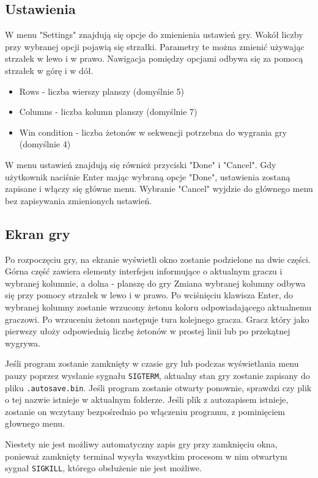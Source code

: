 \documentclass{article}
\begin{document}
\subsection*{Ustawienia}
W menu "Settings" znajdują się opcje do zmienienia ustawień gry. Wokół liczby przy wybranej opcji pojawią się strzałki. 
Parametry te można zmienić używając strzałek w lewo i w prawo. Nawigacja pomiędzy opcjami odbywa się za pomocą strzałek
w górę i w dół.
\begin{itemize}
    \item Rows - liczba wierszy planszy (domyślnie 5)
    \item Columns - liczba kolumn planszy (domyślnie 7)
    \item Win condition - liczba żetonów w sekwencji potrzebna do wygrania gry (domyślnie 4)
\end{itemize}
W menu ustawień znajdują się również przyciski "Done" i "Cancel". Gdy użytkownik naciśnie Enter mając
wybraną opcje "Done", ustawienia zostaną zapisane i włączy się główne menu. Wybranie "Cancel" wyjdzie do głównego menu
bez zapisywania zmienionych ustawień.

\subsection*{Ekran gry}

Po rozpoczęciu gry, na ekranie wyświetli okno zostanie podzielone na dwie części. Górna część zawiera elementy
interfejsu informujące o aktualnym graczu i wybranej kolumnie, a dolna - planszę do gry
Zmiana wybranej kolumny odbywa się przy pomocy strzałek w lewo i w prawo. Po wciśnięciu klawisza Enter, do wybranej
kolumny zostanie wrzucony żetonu koloru odpowiadającego aktualnemu graczowi. Po wrzuceniu żetonu następuje tura
kolejnego gracza. Gracz który jako pierwszy ułoży odpowiednią liczbę żetonów w prostej linii lub po przekątnej wygrywa.

Jeśli program zostanie zamknięty w czasie gry lub podczas wyświetlania menu pauzy poprzez wysłanie sygnału 
\texttt{SIGTERM}, aktualny stan gry zostanie zapisany do pliku \texttt{.autosave.bin}. 
Jeśli program zostanie otwarty ponownie, sprawdzi czy plik o tej nazwie istnieje
w aktualnym folderze. Jeśli plik z autozapisem istnieje, zostanie on wczytany bezpośrednio po włączeniu programu,
z pominięciem głownego menu.

Niestety nie jest możliwy automatyczny zapis gry przy zamknięciu okna, ponieważ zamknięty terminal wysyła wszystkim
procesom w nim otwartym sygnał \texttt{SIGKILL}, którego obsłużenie nie jest możliwe.
\end{document}
